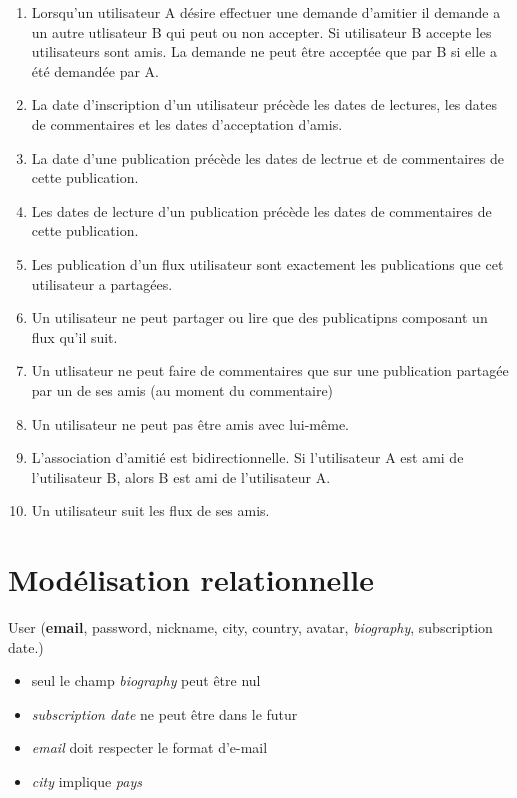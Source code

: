 \documentclass[a4paper,10pt]{article}
\begin{document}
    \begin{enumerate}
	\item Lorsqu'un utilisateur A désire effectuer une demande d'amitier il demande a un autre utlisateur B qui peut ou non accepter. Si utilisateur B accepte les utilisateurs sont amis. La demande ne peut être acceptée que par B si elle
	a été demandée par A.
	\item La date d'inscription d'un utilisateur précède les dates de lectures, les dates de commentaires et les dates d'acceptation d'amis.
	\item La date d'une publication précède les dates de lectrue et de commentaires de cette publication.
	\item Les dates de lecture d'un publication précède les dates de commentaires de cette publication.
	\item Les publication d'un flux utilisateur sont exactement les publications que cet utilisateur a partagées.
	\item Un utilisateur ne peut partager ou lire que des publicatipns composant un flux qu'il suit.
	\item Un utlisateur ne peut faire de commentaires que sur une publication partagée par un de ses amis (au moment du commentaire)
	\item Un utilisateur ne peut pas être amis avec lui-même.
	\item L'association d'amitié est bidirectionnelle. Si l'utilisateur A est ami de l'utilisateur B, alors B est ami de l'utilisateur A.
	\item Un utilisateur suit les flux de ses amis.
    \end{enumerate}

    \section{Modélisation relationnelle}

        User (\textbf{email}, password, nickname, city, country, avatar, \textit{biography}, subscription date.)
            \begin{itemize}            
             \item seul le champ \textit{biography} peut être nul
             \item \textit{subscription date} ne peut être dans le futur
             \item \textit{email} doit respecter le format d'e-mail
             \item \textit{city} implique \textit{pays}
            \end{itemize}
\end{document}
